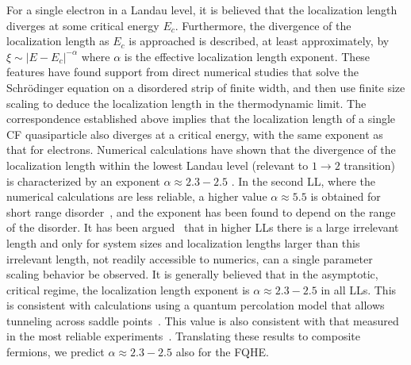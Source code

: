 \documentclass[twocolumn,floatfix,prb,aps,showpacs]{revtex4-2}
\begin{document}
For a single electron in a Landau level, it is believed that the localization length diverges at some critical energy $E_c$. Furthermore, the divergence of the localization length as $E_c$ is approached is described, at least approximately, by $\xi\sim |E-E_c|^{-\alpha}$ where $\alpha$ is the effective localization length exponent. These features have found support from direct numerical studies that solve the Schr\"odinger equation on a disordered strip of finite width, and then use finite size scaling to deduce the localization length in the thermodynamic limit. 
The correspondence established above implies that the localization length of a single CF quasiparticle also diverges at a critical energy, with the same exponent as that for electrons. 
Numerical calculations have shown that the divergence of the localization length within the lowest Landau level (relevant to $1\rightarrow 2$ transition) is characterized by an exponent $\alpha\approx 2.3-2.5$ \cite{Huckestein92,Huo92}.  In the second LL, where the numerical calculations are less reliable, a higher value $\alpha\approx 5.5$ is obtained for short range disorder~\cite{Mieck93,Liu93,Liu94}, and the exponent has been found to depend on the range of the disorder.   It has been argued~\cite{Huckestein94} that in higher LLs there is a large irrelevant length and only for system sizes and localization lengths larger than this irrelevant length, not readily accessible to numerics, can a single parameter scaling behavior be observed. 
It is generally believed that in the asymptotic, critical regime, the localization length exponent is $\alpha\approx 2.3-2.5$ in all LLs. This is consistent with calculations using a quantum percolation model that allows tunneling across saddle points~\cite{Chalker88,Lee93}. This value is also consistent with that measured in the most reliable experiments~\cite{Li09}.
Translating these results to composite fermions, we predict $\alpha\approx 2.3-2.5$ also for the FQHE. 
\end{document}
